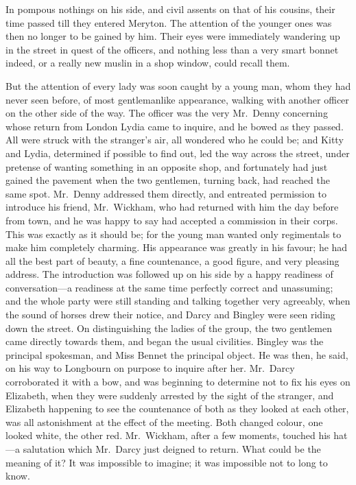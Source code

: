 \documentclass[12pt,english,oneside]{book}
\begin{document}
In pompous nothings on his side, and civil assents on that of his
cousins, their time passed till they entered Meryton. The attention
of the younger ones was then no longer to be gained by him. Their
eyes were immediately wandering up in the street in quest of the officers,
and nothing less than a very smart bonnet indeed, or a really new
muslin in a shop window, could recall them.

But the attention of every lady was soon caught by a young man, whom
they had never seen before, of most gentlemanlike appearance, walking
with another officer on the other side of the way. The officer was
the very Mr.\ Denny concerning whose return from London Lydia came
to inquire, and he bowed as they passed. All were struck with the
stranger's air, all wondered who he could be; and Kitty and Lydia,
determined if possible to find out, led the way across the street,
under pretense of wanting something in an opposite shop, and fortunately
had just gained the pavement when the two gentlemen, turning back,
had reached the same spot. Mr.\ Denny addressed them directly, and
entreated permission to introduce his friend, Mr.\ Wickham, who had
returned with him the day before from town, and he was happy to say
had accepted a commission in their corps. This was exactly as it should
be; for the young man wanted only regimentals to make him completely
charming. His appearance was greatly in his favour; he had all the
best part of beauty, a fine countenance, a good figure, and very pleasing
address. The introduction was followed up on his side by a happy readiness
of conversation\mbox{---}a readiness at the same time perfectly correct
and unassuming; and the whole party were still standing and talking
together very agreeably, when the sound of horses drew their notice,
and Darcy and Bingley were seen riding down the street. On distinguishing
the ladies of the group, the two gentlemen came directly towards them,
and began the usual civilities. Bingley was the principal spokesman,
and Miss Bennet the principal object. He was then, he said, on his
way to Longbourn on purpose to inquire after her. Mr.\ Darcy corroborated
it with a bow, and was beginning to determine not to fix his eyes
on Elizabeth, when they were suddenly arrested by the sight of the
stranger, and Elizabeth happening to see the countenance of both as
they looked at each other, was all astonishment at the effect of the
meeting. Both changed colour, one looked white, the other red. Mr.\ Wickham,
after a few moments, touched his hat\mbox{---}a salutation which
Mr.\ Darcy just deigned to return. What could be the meaning of it?
It was impossible to imagine; it was impossible not to long to know.
\end{document}
